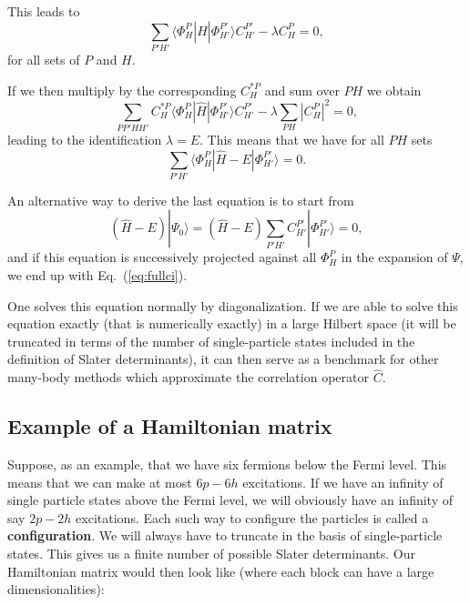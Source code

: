 \documentclass[%
twoside,                 %
final,                   %
10pt]{article}
\begin{document}
This leads to 
\[
\sum_{P'H'}\langle \Phi_H^P | \hat{H} |\Phi_{H'}^{P'} \rangle C_{H'}^{P'}-\lambda C_H^{P}=0,
\]
for all sets of $P$ and $H$.

If we then multiply by the corresponding $C_H^{*P}$ and sum over $PH$ we obtain
\[ 
\sum_{PP'HH'}C_H^{*P}\langle \Phi_H^P | \hat{H} |\Phi_{H'}^{P'} \rangle C_{H'}^{P'}-\lambda\sum_{PH}|C_H^P|^2=0,
\]
leading to the identification $\lambda = E$. This means that we have for all $PH$ sets
\begin{equation}
\sum_{P'H'}\langle \Phi_H^P | \hat{H} -E|\Phi_{H'}^{P'} \rangle = 0. \label{eq:fullci}
\end{equation}



An alternative way to derive the last equation is to start from 
\[
(\hat{H} -E)|\Psi_0\rangle = (\hat{H} -E)\sum_{P'H'}C_{H'}^{P'}|\Phi_{H'}^{P'} \rangle=0, 
\]
and if this equation is successively projected against all $\Phi_H^P$ in the expansion of $\Psi$, we end up with Eq.~(\ref{eq:fullci}).

One solves this equation normally by diagonalization. If we are able to solve this equation exactly (that is
numerically exactly) in a large Hilbert space (it will be truncated in terms of the number of single-particle states included in the definition
of Slater determinants), it can then serve as a benchmark for other many-body methods which approximate the correlation operator
$\hat{C}$.  


\subsection{Example of a Hamiltonian matrix}

Suppose, as an example, that we have six fermions below the Fermi level.
This means that we can make at most $6p-6h$ excitations. If we have an infinity of single particle states above the Fermi level, we will obviously have an infinity of say $2p-2h$ excitations. Each such way to configure the particles is called a \textbf{configuration}. We will always have to truncate in the basis of single-particle states.
This gives us a finite number of possible Slater determinants. Our Hamiltonian matrix would then look like (where each block can have a large dimensionalities):
\end{document}
